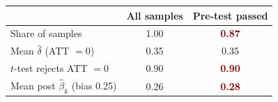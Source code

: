 \begin{tabular}{@{}lcc@{}}
\toprule
 & All samples & Pre-test passed \\
\midrule
Share of samples & 1.00 & \textcolor{Maroon}{\bfseries 0.87} \\
Mean $\hat\delta$ (ATT $= 0$) & 0.35 & 0.35 \\
$t$-test rejects ATT $= 0$ & 0.90 & \textcolor{Maroon}{\bfseries 0.90} \\
Mean post $\hat\beta_k$ (bias 0.25) & 0.26 & \textcolor{Maroon}{\bfseries 0.28} \\
\bottomrule
\end{tabular}
